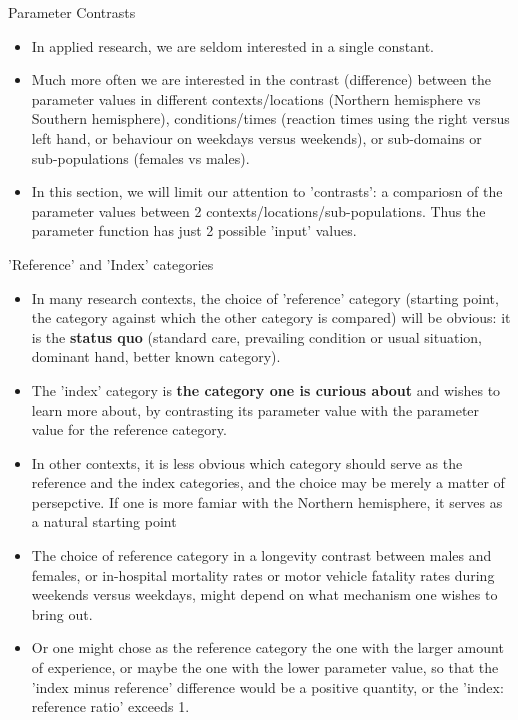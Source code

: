 \documentclass[10pt]{beamer}\usepackage[]{graphicx}\usepackage[]{color}
\begin{document}
\begin{frame}{Parameter Contrasts}
	\begin{itemize}
		\item In applied research, we are seldom interested in a single constant. 
		
		
				\pause 
		
		\item Much more often we are interested in the contrast (difference) between the parameter values in different contexts/locations (Northern hemisphere vs Southern hemisphere), conditions/times (reaction times using the right versus left hand, or behaviour on weekdays versus weekends), or sub-domains or sub-populations (females vs males).
		
		\pause 
		
		\item In this section, we will limit our attention to 'contrasts': a compariosn of the parameter values between 2 contexts/locations/sub-populations. Thus the parameter function has just 2 possible 'input' values. 
	\end{itemize}
\end{frame}



\begin{frame}{'Reference' and 'Index' categories}
	\begin{itemize}
		\item In many research contexts, the choice of 'reference' category (starting point, the category against which the other category is compared) will be obvious: it is the \textbf{status quo} (standard care, prevailing condition or usual situation, dominant hand, better known category). 
		\pause 
		\item The 'index' category is \textbf{the category one is curious about} and wishes to learn more about, by contrasting its parameter value with the parameter value for the reference category.
		\pause 		
		\item In other contexts, it is less obvious which category should serve as the reference and the index categories, and the choice may be merely a matter of persepctive. If one is more famiar with the Northern hemisphere, it serves as a natural starting point 
		
				\pause 
		\item The choice of reference category in a longevity contrast between males and females, or in-hospital mortality rates or motor vehicle fatality rates during weekends versus weekdays, might depend on what mechanism one wishes to bring out. 
		
				\pause 
		\item Or one might chose as the reference category the one with the larger amount of experience, or maybe the one with the lower parameter value, so that the 'index minus reference' difference would be a positive quantity, or the 'index: reference ratio' exceeds 1.
	\end{itemize}
\end{frame}
\end{document}
